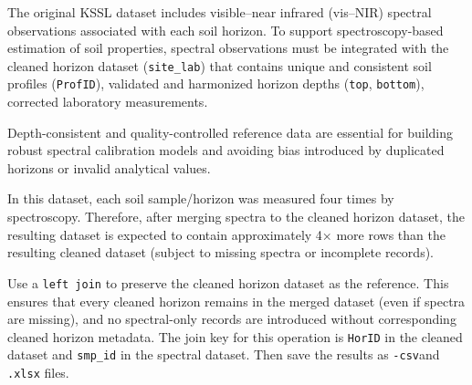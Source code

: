 \documentclass[
  10pt,
  b5paper,
  oneside]{book}
\begin{document}
The original KSSL dataset includes visible--near infrared (vis--NIR) spectral observations associated with each soil horizon. To support spectroscopy-based estimation of soil properties, spectral observations must be integrated with the cleaned horizon dataset (\texttt{site\_lab}) that contains unique and consistent soil profiles (\texttt{ProfID}), validated and harmonized horizon depths (\texttt{top}, \texttt{bottom}), corrected laboratory measurements.

Depth-consistent and quality-controlled reference data are essential for building robust spectral calibration models and avoiding bias introduced by duplicated horizons or invalid analytical values.

In this dataset, each soil sample/horizon was measured four times by spectroscopy. Therefore, after merging spectra to the cleaned horizon dataset, the resulting dataset is expected to contain approximately 4× more rows than the resulting cleaned dataset (subject to missing spectra or incomplete records).

Use a \texttt{left\ join} to preserve the cleaned horizon dataset as the reference. This ensures that every cleaned horizon remains in the merged dataset (even if spectra are missing), and no spectral-only records are introduced without corresponding cleaned horizon metadata. The join key for this operation is \texttt{HorID} in the cleaned dataset and \texttt{smp\_id} in the spectral dataset. Then save the results as \texttt{-csv}and \texttt{.xlsx} files.
\end{document}
